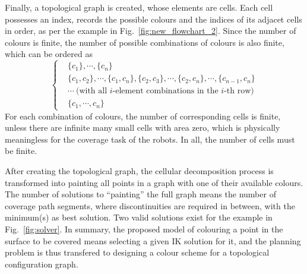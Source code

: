 \documentclass[journal]{IEEEtran}
\begin{document}
Finally, a topological graph is created, whose elements are cells. Each cell possesses an index, records the possible colours 
and the indices of its adjacet cells in order, as per the example in Fig.~\ref{fig:new_flowchart_2}. 
Since the number of colours is finite, the number of possible combinations of colours is also finite, which can be ordered as
$$\left\{
\begin{aligned}
&\{c_1\}, \cdots, \{c_n\}\\
&\{c_1, c_2\}, \cdots, \{c_1, c_n\}, \{c_2, c_3\}, \cdots, \{c_2, c_n\}, \cdots, \{c_{n-1}, c_n\}\\
&\cdots\ \mbox{(with all $i$-element combinations in the $i$-th row)}\\
&\{c_1, \cdots, c_n\}
\end{aligned}
\right.$$
For each combination of colours, the number of corresponding cells is finite, unless there are infinite many small cells with area zero, which is physically meaningless for the coverage task of the robots. In all, the number of cells must be finite. 

After creating the topological graph, the cellular decomposition process is transformed into painting all points in a graph with 
one of their available colours.
The number of %
solutions to ``painting'' the full graph means the number of coverage path segments, where discontinuities are required in between, with the minimum(s) as best solution. Two valid solutions exist for the example in Fig.~\ref{fig:solver}. 
In summary, the proposed model of colouring a point in the surface to be covered means selecting a given IK solution for it, 
and the planning problem is thus transfered to designing a colour scheme for a topological configuration graph.
\end{document}
